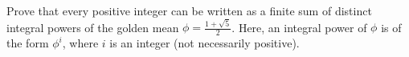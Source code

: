Prove that every positive integer can be written as a finite sum of distinct integral powers of the golden mean $\phi=\frac{1+\sqrt{5}}{2}$. Here, an integral power of $\phi$ is of the form $\phi^i$, where $i$ is an integer (not necessarily positive).
